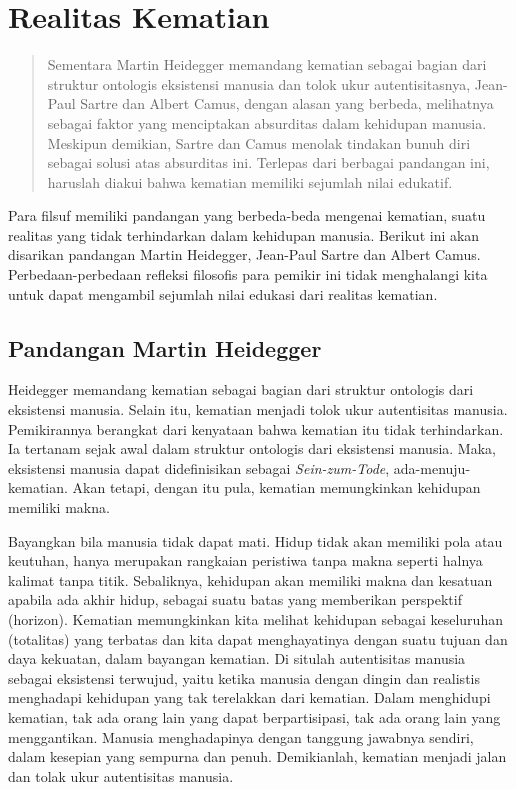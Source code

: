 \documentclass[11pt,twoside,a5paper,openany]{memoir}
\begin{document}
\hypertarget{realitas-kematian}{%
\section{Realitas Kematian}\label{realitas-kematian}}

\begin{quote}
Sementara Martin Heidegger memandang kematian sebagai bagian dari
struktur ontologis eksistensi manusia dan tolok ukur autentisitasnya,
Jean-Paul Sartre dan Albert Camus, dengan alasan yang berbeda,
melihatnya sebagai faktor yang menciptakan absurditas dalam kehidupan
manusia. Meskipun demikian, Sartre dan Camus menolak tindakan bunuh diri
sebagai solusi atas absurditas ini. Terlepas dari berbagai pandangan
ini, haruslah diakui bahwa kematian memiliki sejumlah nilai edukatif.
\end{quote}

Para filsuf memiliki pandangan yang berbeda-beda mengenai kematian,
suatu realitas yang tidak terhindarkan dalam kehidupan manusia. Berikut
ini akan disarikan pandangan Martin Heidegger, Jean-Paul Sartre dan
Albert Camus. Perbedaan-perbedaan refleksi filosofis para pemikir ini
tidak menghalangi kita untuk dapat mengambil sejumlah nilai edukasi dari
realitas kematian.

\hypertarget{pandangan-martin-heidegger-1}{%
\subsection{Pandangan Martin
Heidegger}\label{pandangan-martin-heidegger-1}}

Heidegger memandang kematian sebagai bagian dari struktur ontologis dari
eksistensi manusia. Selain itu, kematian menjadi tolok ukur autentisitas
manusia. Pemikirannya berangkat dari kenyataan bahwa kematian itu tidak
terhindarkan. Ia tertanam sejak awal dalam struktur ontologis dari
eksistensi manusia. Maka, eksistensi manusia dapat didefinisikan sebagai
\emph{Sein-zum-Tode}, ada-menuju-kematian. Akan tetapi, dengan itu pula,
kematian memungkinkan kehidupan memiliki makna.

Bayangkan bila manusia tidak dapat mati. Hidup tidak akan memiliki pola
atau keutuhan, hanya merupakan rangkaian peristiwa tanpa makna seperti
halnya kalimat tanpa titik. Sebaliknya, kehidupan akan memiliki makna
dan kesatuan apabila ada akhir hidup, sebagai suatu batas yang
memberikan perspektif (horizon). Kematian memungkinkan kita melihat
kehidupan sebagai keseluruhan (totalitas) yang terbatas dan kita dapat
menghayatinya dengan suatu tujuan dan daya kekuatan, dalam bayangan
kematian. Di situlah autentisitas manusia sebagai eksistensi terwujud,
yaitu ketika manusia dengan dingin dan realistis menghadapi kehidupan
yang tak terelakkan dari kematian. Dalam menghidupi kematian, tak ada
orang lain yang dapat berpartisipasi, tak ada orang lain yang
menggantikan. Manusia menghadapinya dengan tanggung jawabnya sendiri,
dalam kesepian yang sempurna dan penuh. Demikianlah, kematian menjadi
jalan dan tolak ukur autentisitas manusia.
\end{document}
